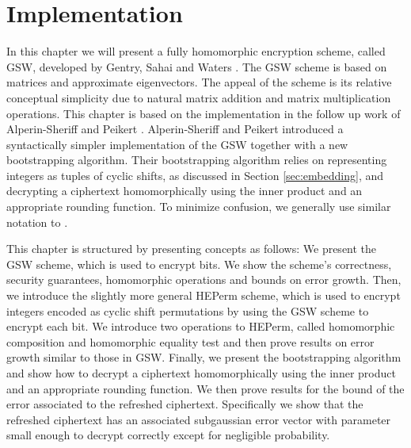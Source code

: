 \chapter{Implementation}\label{ch:implementation}



In this chapter we will present a fully homomorphic encryption scheme, called GSW, developed by Gentry, Sahai and Waters \cite{GSW13}. The GSW scheme is based on matrices and approximate eigenvectors. The appeal of the scheme is its relative conceptual simplicity due to natural matrix addition and matrix multiplication operations. This chapter is based on the implementation in the follow up work of Alperin-Sheriff and Peikert \cite{A-S-P-boot}. Alperin-Sheriff and Peikert introduced a syntactically simpler implementation of the GSW together with a new bootstrapping algorithm. Their bootstrapping algorithm relies on representing integers as tuples of cyclic shifts, as discussed in Section \ref{sec:embedding}, and decrypting a ciphertext homomorphically using the inner product and an appropriate rounding function. To minimize confusion, we generally use similar notation to \cite{A-S-P-boot}.

This chapter is structured by presenting concepts as follows: We present the GSW scheme, which is used to encrypt bits. We show the scheme's correctness, security guarantees, homomorphic operations and bounds on error growth. Then, we introduce the slightly more general HEPerm scheme, which is used to encrypt integers encoded as cyclic shift permutations by using the GSW scheme to encrypt each bit. We introduce two operations to HEPerm, called homomorphic composition and homomorphic equality test and then prove results on error growth similar to those in GSW. Finally, we present the bootstrapping algorithm and show how to decrypt a ciphertext homomorphically using the inner product and an appropriate rounding function. We then prove results for the bound of the error associated to the refreshed ciphertext. Specifically we show that the refreshed ciphertext has an associated subgaussian error vector with parameter small enough to decrypt correctly except for negligible probability.

